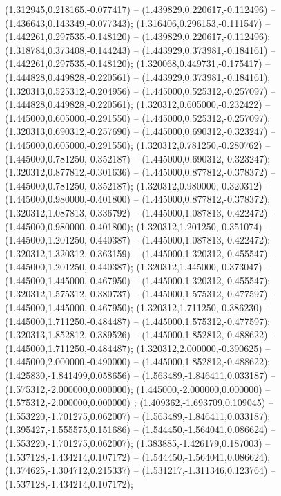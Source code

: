  (1.312945,0.218165,-0.077417) -- (1.439829,0.220617,-0.112496) -- (1.436643,0.143349,-0.077343);
 (1.316406,0.296153,-0.111547) -- (1.442261,0.297535,-0.148120) -- (1.439829,0.220617,-0.112496);
 (1.318784,0.373408,-0.144243) -- (1.443929,0.373981,-0.184161) -- (1.442261,0.297535,-0.148120);
 (1.320068,0.449731,-0.175417) -- (1.444828,0.449828,-0.220561) -- (1.443929,0.373981,-0.184161);
 (1.320313,0.525312,-0.204956) -- (1.445000,0.525312,-0.257097) -- (1.444828,0.449828,-0.220561);
 (1.320312,0.605000,-0.232422) -- (1.445000,0.605000,-0.291550) -- (1.445000,0.525312,-0.257097);
 (1.320313,0.690312,-0.257690) -- (1.445000,0.690312,-0.323247) -- (1.445000,0.605000,-0.291550);
 (1.320312,0.781250,-0.280762) -- (1.445000,0.781250,-0.352187) -- (1.445000,0.690312,-0.323247);
 (1.320312,0.877812,-0.301636) -- (1.445000,0.877812,-0.378372) -- (1.445000,0.781250,-0.352187);
 (1.320312,0.980000,-0.320312) -- (1.445000,0.980000,-0.401800) -- (1.445000,0.877812,-0.378372);
 (1.320312,1.087813,-0.336792) -- (1.445000,1.087813,-0.422472) -- (1.445000,0.980000,-0.401800);
 (1.320312,1.201250,-0.351074) -- (1.445000,1.201250,-0.440387) -- (1.445000,1.087813,-0.422472);
 (1.320312,1.320312,-0.363159) -- (1.445000,1.320312,-0.455547) -- (1.445000,1.201250,-0.440387);
 (1.320312,1.445000,-0.373047) -- (1.445000,1.445000,-0.467950) -- (1.445000,1.320312,-0.455547);
 (1.320312,1.575312,-0.380737) -- (1.445000,1.575312,-0.477597) -- (1.445000,1.445000,-0.467950);
 (1.320312,1.711250,-0.386230) -- (1.445000,1.711250,-0.484487) -- (1.445000,1.575312,-0.477597);
 (1.320313,1.852812,-0.389526) -- (1.445000,1.852812,-0.488622) -- (1.445000,1.711250,-0.484487);
 (1.320312,2.000000,-0.390625) -- (1.445000,2.000000,-0.490000) -- (1.445000,1.852812,-0.488622);
 (1.425830,-1.841499,0.058656) -- (1.563489,-1.846411,0.033187) -- (1.575312,-2.000000,0.000000);
 (1.445000,-2.000000,0.000000) -- (1.575312,-2.000000,0.000000) ;
 (1.409362,-1.693709,0.109045) -- (1.553220,-1.701275,0.062007) -- (1.563489,-1.846411,0.033187);
 (1.395427,-1.555575,0.151686) -- (1.544450,-1.564041,0.086624) -- (1.553220,-1.701275,0.062007);
 (1.383885,-1.426179,0.187003) -- (1.537128,-1.434214,0.107172) -- (1.544450,-1.564041,0.086624);
 (1.374625,-1.304712,0.215337) -- (1.531217,-1.311346,0.123764) -- (1.537128,-1.434214,0.107172);
